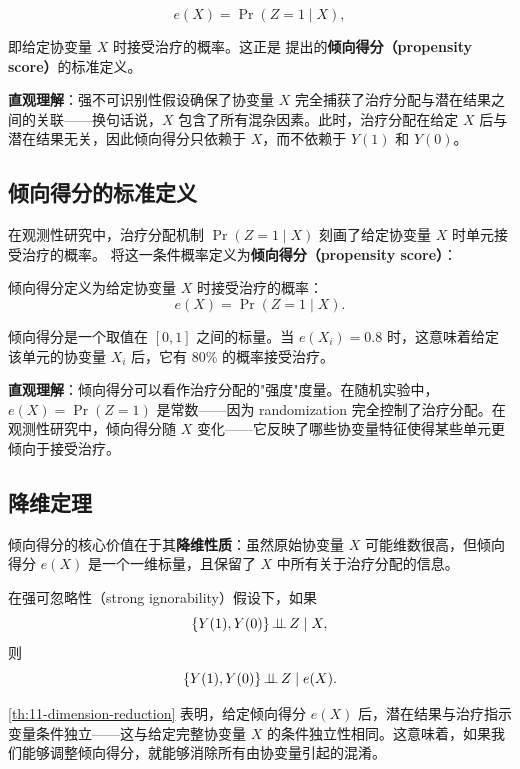 \[
e(X) = \Pr(Z = 1 \mid X),
\tag{11.2}
\]

即给定协变量 $X$ 时接受治疗的概率。这正是 \citet{RosenbaumRubin:1983} 提出的\textbf{倾向得分（propensity score）}的标准定义。

\textbf{直观理解}：强不可识别性假设确保了协变量 $X$ 完全捕获了治疗分配与潜在结果之间的关联——换句话说，$X$ 包含了所有混杂因素。此时，治疗分配在给定 $X$ 后与潜在结果无关，因此倾向得分只依赖于 $X$，而不依赖于 $Y(1)$ 和 $Y(0)$。

\subsection{倾向得分的标准定义}

在观测性研究中，治疗分配机制 $\Pr(Z=1 \mid X)$ 刻画了给定协变量 $X$ 时单元接受治疗的概率。\citet{RosenbaumRubin:1983} 将这一条件概率定义为\textbf{倾向得分（propensity score）}：

\begin{Definition}\label{def:11-propensity-score}
倾向得分定义为给定协变量 $X$ 时接受治疗的概率：
\[
e(X) = \Pr(Z = 1 \mid X) .
\]
\end{Definition}

倾向得分是一个取值在 $[0,1]$ 之间的标量。当 $e(X_i) = 0.8$ 时，这意味着给定该单元的协变量 $X_i$ 后，它有 80\% 的概率接受治疗。

\textbf{直观理解}：倾向得分可以看作治疗分配的"强度"度量。在随机实验中，$e(X) = \Pr(Z=1)$ 是常数——因为 randomization 完全控制了治疗分配。在观测性研究中，倾向得分随 $X$ 变化——它反映了哪些协变量特征使得某些单元更倾向于接受治疗。

\subsection{降维定理}\label{sec:11-dimension-reduction}

倾向得分的核心价值在于其\textbf{降维性质}：虽然原始协变量 $X$ 可能维数很高，但倾向得分 $e(X)$ 是一个一维标量，且保留了 $X$ 中所有关于治疗分配的信息。

\begin{Theorem}\label{th:11-dimension-reduction}
在强可忽略性（strong ignorability）假设下，如果
\[
\{Y(1), Y(0)\} \operatorname{\mathrel{\perp\!\!\!\perp}} Z \mid X,
\]
则
\[
\{Y(1), Y(0)\} \operatorname{\mathrel{\perp\!\!\!\perp}} Z \mid e(X) .
\]
\end{Theorem}

\cref{th:11-dimension-reduction} 表明，给定倾向得分 $e(X)$ 后，潜在结果与治疗指示变量条件独立——这与给定完整协变量 $X$ 的条件独立性相同。这意味着，如果我们能够调整倾向得分，就能够消除所有由协变量引起的混淆。

